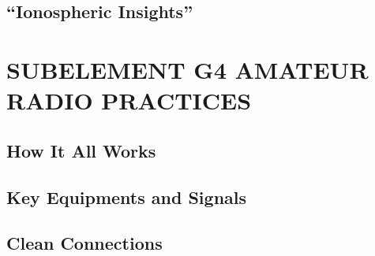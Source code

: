 \documentclass[12pt]{book}
\begin{document}
\section{“Ionospheric Insights”}











\chapter{SUBELEMENT G4  AMATEUR RADIO PRACTICES}
\section{How It All Works}













\section{Key Equipments and Signals}













\section{Clean Connections}












\end{document}
